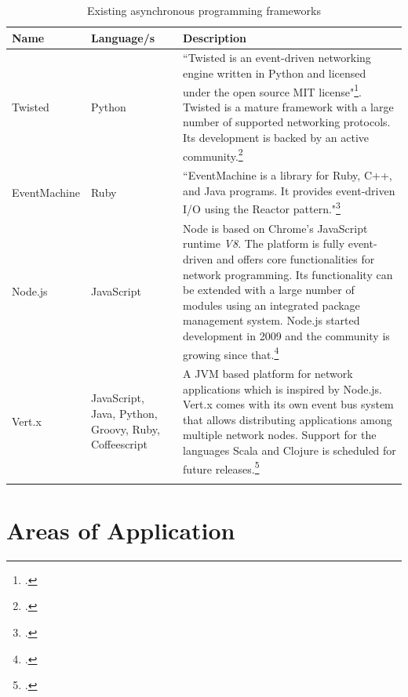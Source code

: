 \FloatBarrier

\begin{savenotes} %
\begin{longtable}[c]{p{} p{} p{}}
\toprule
\textbf{Name} & \textbf{Language/s} & \textbf{Description} \\
\midrule 
\endhead
Twisted			& Python			& ``Twisted is an event-driven networking engine written in 
									  Python and licensed under the open source MIT license"\footcite[Cf.][]{Twisted_2012}.
									  Twisted is a mature framework with a large number of supported networking
									  protocols. Its development is backed by an active
									  community.\footcite[Cf.][12]{fettig_2005}
									  \\
									  
EventMachine 	& Ruby    			& ``EventMachine is a library for Ruby, C++, and Java
									  programs. It provides event-driven I/O using the Reactor 
									  pattern."\footcite[][]{eventmachine_2012}\\

Node.js			& JavaScript		& Node is based on Chrome's JavaScript runtime \textit{V8}.
									  The platform is fully event-driven and offers core
									  functionalities for network programming. Its functionality
									  can be extended with a large number of modules using an
									  integrated package management system.
									  Node.js started development in 2009 and the community
									  is growing since that.\footcite[Cf.][]{Mashtable_2011}\\
									  
Vert.x			& JavaScript, Java, Python, Groovy, Ruby, Coffeescript		
									& A JVM based platform for network applications which is
									  inspired by Node.js. Vert.x comes with its own event
									  bus system that allows distributing applications
									  among multiple network nodes. Support for the languages
									  Scala and Clojure is scheduled for future releases.\footcite[Cf.][]{vertx_2012}\\
\bottomrule 
  \caption{Existing asynchronous programming frameworks}
  \label{tab:existing_frameworks}
\end{longtable}
\end{savenotes}


\FloatBarrier


\newpage
\section{Areas of Application}
\label{areas_of_application}

